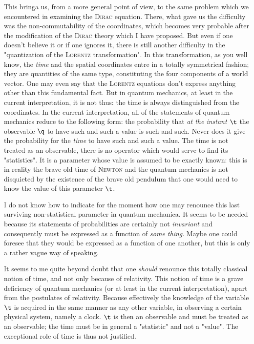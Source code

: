 \documentclass{article}
\renewcommand{\it}[1]{\textit{#1}}
\renewcommand{\sc}[1]{\textsc{#1}}
\begin{document}
This bringa us, from a more general point of view, to the same problem which we encountered in examining the \sc{Dirac} equation. There, what gave us the difficulty was the non-commutability of the coordinates, which becomes very probable after the modification of the \sc{Dirac} theory which I have proposed. But even if one doesn't believe it or if one ignores it, there is still another difficulty in the "quantization of the \sc{Lorentz} transformation". In this transformation, as you well know, the \it{time} and the spatial coordinates entre in a totally symmetrical fashion; they are quantities of the same type, constituting the four components of a world vector. One may even say that the \sc{Lorentz} equations don't express anything other than this fundamental fact. But in quantum mechanics, at least in the current interpretation, it is not thus: the time is always distinguished from the coordinates. In the current interpretation, all of the statements of quantum mechanics reduce to the following form: the probability that \it{at the instant $\t$} the observable $\q$ to have such and such a value is such and such. Never does it give the probability for the \it{time} to have such and such a value. The time is not treated as an observable, there is no operator which would serve to find its "statistics". It is a parameter whose value is assumed to be exactly known: this is in reality the brave old time of \sc{Newton} and the quantum mechanics is not disquieted by the existence of the brave old pendulum that one would need to know the value of this parameter $\t$.

I do not know how to indicate for the moment how one may renounce this last surviving non-statistical parameter in quantum mechanica. It seems to be needed because its statements of probabilities are certainly not \it{invariant} and consequently must be expressed as a function of \it{some thing}. Maybe one could foresee that they would be expressed as a function of one another, but this is only a rather vague way of speaking.

It seems to me quite beyond doubt that one \it{should} renounce this totally classical notion of time, and not only because of relativity. This notion of time is a grave deficiency of quantum mechanics (or at least in the current interpretation), apart from the postulates of relativity. Because effectively the knowledge of the variable $\t$ is acquired in the same manner as any other variable, in observing a certain physical system, namely a clock. $\t$ is then an observable and must be treated as an observable; the time must be in general a "statistic" and not a "value". The exceptional role of time is thus not justified.
\end{document}
